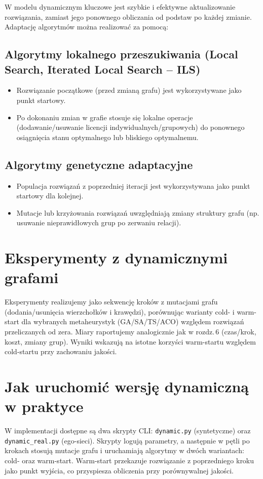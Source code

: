 W modelu dynamicznym kluczowe jest szybkie i efektywne aktualizowanie rozwiązania, zamiast jego ponownego obliczania od podstaw po każdej zmianie. Adaptację algorytmów można realizować za pomocą:

\subsection{Algorytmy lokalnego przeszukiwania (Local Search, Iterated Local Search – ILS)}

\begin{itemize}
    \item Rozwiązanie początkowe (przed zmianą grafu) jest wykorzystywane jako punkt startowy.
    \item Po dokonaniu zmian w grafie stosuje się lokalne operacje (dodawanie/usuwanie licencji indywidualnych/grupowych) do ponownego osiągnięcia stanu optymalnego lub bliskiego optymalnemu.
\end{itemize}

\subsection{Algorytmy genetyczne adaptacyjne}

\begin{itemize}
    \item Populacja rozwiązań z poprzedniej iteracji jest wykorzystywana jako punkt startowy dla kolejnej.
    \item Mutacje lub krzyżowania rozwiązań uwzględniają zmiany struktury grafu (np. usuwanie nieprawidłowych grup po zerwaniu relacji).
\end{itemize}


\section{Eksperymenty z dynamicznymi grafami}

Eksperymenty realizujemy jako sekwencję kroków z mutacjami grafu (dodania/usunięcia wierzchołków i krawędzi), porównując warianty cold- i warm-start dla wybranych metaheurystyk (GA/SA/TS/ACO) względem rozwiązań przeliczanych od zera. Miary raportujemy analogicznie jak w rozdz.\,6 (czas/krok, koszt, zmiany grup). Wyniki wskazują na istotne korzyści warm-startu względem cold-startu przy zachowaniu jakości.

\section{Jak uruchomić wersję dynamiczną w praktyce}
W implementacji dostępne są dwa skrypty CLI: \texttt{dynamic.py} (syntetyczne) oraz \texttt{dynamic\_real.py} (ego-sieci). Skrypty logują parametry, a następnie w pętli po krokach stosują mutacje grafu i uruchamiają algorytmy w dwóch wariantach: cold- oraz warm-start. Warm-start przekazuje rozwiązanie z poprzedniego kroku jako punkt wyjścia, co przyspiesza obliczenia przy porównywalnej jakości.

